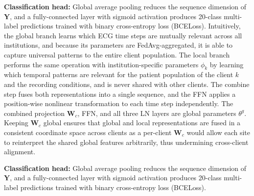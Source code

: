 \documentclass[conference]{IEEEtran}
\begin{document}
{\textbf{Classification head:}
Global average pooling reduces the sequence dimension of $\mathbf{Y}$, and a fully-connected layer with sigmoid activation produces 20-class multi-label predictions trained with binary cross-entropy loss (BCELoss).
Intuitively, the global branch learns which ECG time steps are mutually relevant across all institutions, and because its parameters are FedAvg-aggregated, it is able to capture universal patterns to the entire client population. The local branch performs the same operation with institution-specific parameters $\phi_k$ by learning which temporal patterns are relevant for the patient population of the client $k$ and the recording conditions, and is never shared with other clients. The combine step fuses both representations into a single sequence, and the FFN applies a position-wise nonlinear transformation to each time step independently. The combined projection $\mathbf{W}_c$, FFN, and all three LN layers are global parameters $\theta^g$. Keeping $\mathbf{W}_c$ global ensures that global and local representations are fused in a consistent coordinate space across clients as a per-client $\mathbf{W}_c$ would allow each site to reinterpret the shared global features arbitrarily, thus undermining cross-client alignment.

\textbf{Classification head:}
Global average pooling reduces the sequence dimension of $\mathbf{Y}$, and a fully-connected layer with sigmoid activation produces 20-class multi-label predictions trained with binary cross-entropy loss (BCELoss).

}
\end{document}

